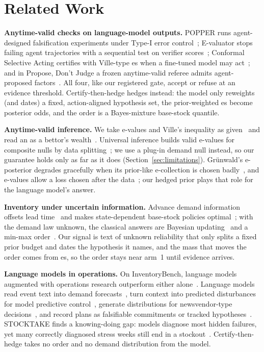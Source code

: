 \section{Related Work}
\label{sec:related}

\textbf{Anytime-valid checks on language-model outputs.} POPPER runs
agent-designed falsification experiments under Type-I error
control~\cite{popper}; E-valuator stops failing agent trajectories with a
sequential test on verifier scores~\cite{e-valuator}; Conformal Selective
Acting certifies with Ville-type \eprocess{}es when a fine-tuned model may
act~\cite{csa}; and in Propose, Don't Judge a frozen anytime-valid referee
admits agent-proposed factors~\cite{propose-dont-judge}. All four, like our
registered gate, accept or refuse at an evidence threshold. Certify-then-hedge
hedges instead: the model only reweights (and dates) a fixed, action-aligned hypothesis set,
the prior-weighted \eprocess{}es become posterior odds, and the order is a
Bayes-mixture base-stock quantile.

\textbf{Anytime-valid inference.} We take e-values and Ville's inequality as
given~\cite{vovk-wang-evalues, ramdas-savi, ville} and read an \eprocess{} as a
bettor's wealth~\cite{shafer-betting}. Universal inference builds valid e-values
for composite nulls by data splitting~\cite{universal-inference}; we use a
plug-in demand null instead, so our guarantee holds only as far as it does
(Section~\ref{sec:limitations}). Gr\"unwald's e-posterior degrades gracefully
when its prior-like e-collection is chosen badly~\cite{grunwald-eposterior}, and
e-values allow a loss chosen after the data~\cite{grunwald-beyond-np}; our hedged
prior plays that role for the language model's answer.

\textbf{Inventory under uncertain information.} Advance demand information
offsets lead time~\cite{hariharan-zipkin} and makes state-dependent base-stock
policies optimal~\cite{gallego-ozer}; with the demand law unknown, the classical
answers are Bayesian updating~\cite{scarf-bayes} and a min-max
order~\cite{scarf-minmax}. Our signal is text of unknown reliability that only
splits a fixed prior budget and dates the hypothesis it names, and the mass that moves the order comes from
\eprocess{}es, so the order stays near arm~1 until evidence arrives.

\textbf{Language models in operations.} On InventoryBench, language models
augmented with operations research outperform either
alone~\cite{inventorybench}. Language models read event text into demand
forecasts~\cite{eventcast}, turn context into predicted disturbances for model
predictive control~\cite{instructmpc}, generate distributions for
newsvendor-type decisions~\cite{llm-saa}, and record plans as falsifiable
commitments or tracked hypotheses~\cite{fcpagent, hep}. STOCKTAKE finds a
knowing-doing gap: models diagnose most hidden failures, yet many correctly
diagnosed stress weeks still end in a stockout~\cite{stocktake}. Certify-then-hedge takes no order and no demand
distribution from the model.
